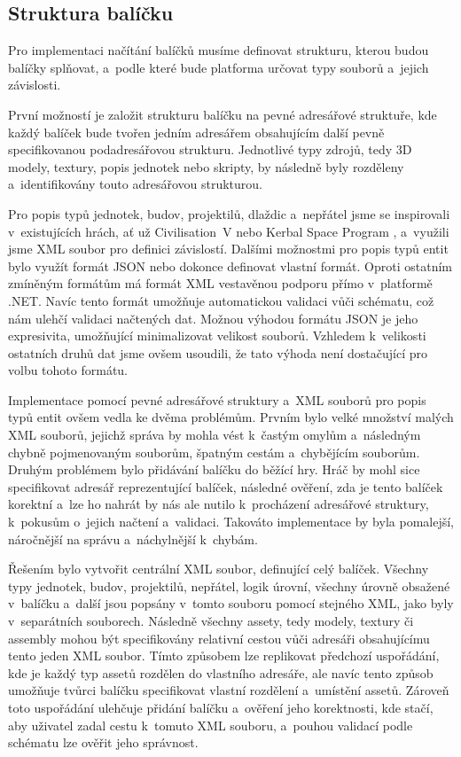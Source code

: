 \subsection{Struktura balíčku}
\label{sec:packagestructure}
Pro implementaci načítání balíčků musíme definovat strukturu, kterou budou balíčky splňovat, a~podle které bude platforma určovat typy souborů a~jejich závislosti.

První možností je založit strukturu balíčku na pevné adresářové struktuře, kde každý balíček bude tvořen jedním adresářem obsahujícím další pevně specifikovanou podadresářovou strukturu. Jednotlivé typy zdrojů, tedy 3D modely, textury, popis jednotek nebo skripty, by následně byly rozděleny a~identifikovány touto adresářovou strukturou. 

Pro popis typů jednotek, budov, projektilů, dlaždic a~nepřátel jsme se inspirovali v~existujících hrách, ať už Civilisation~V \citep{site:civ5} nebo Kerbal Space Program \citep{site:ksp}, a~využili jsme XML soubor pro definici závislostí. Dalšími možnostmi pro popis typů entit bylo využít formát JSON nebo dokonce definovat vlastní formát. Oproti ostatním zmíněným formátům má formát XML vestavěnou podporu přímo v~platformě .NET. Navíc tento formát umožňuje automatickou validaci vůči schématu, což nám ulehčí  validaci načtených dat. Možnou výhodou formátu JSON je jeho expresivita, umožňující minimalizovat velikost souborů. Vzhledem k~velikosti ostatních druhů dat jsme ovšem usoudili, že tato výhoda není dostačující pro volbu tohoto formátu. 

Implementace pomocí pevné adresářové struktury a~XML souborů pro popis typů entit ovšem vedla ke dvěma problémům. Prvním bylo velké množství malých XML souborů, jejichž správa by mohla vést k~častým omylům a~následným chybně pojmenovaným souborům, špatným cestám a~chybějícím souborům. Druhým problémem bylo přidávání balíčku do běžící hry. Hráč by mohl sice specifikovat adresář reprezentující balíček, následné ověření, zda je tento balíček korektní a~lze ho nahrát by nás ale nutilo k~procházení adresářové struktury, k~pokusům o~jejich načtení a~validaci. Takováto implementace by byla pomalejší, náročnější na správu a~náchylnější k~chybám. 

Řešením bylo vytvořit centrální XML soubor, definující celý balíček. Všechny typy jednotek, budov, projektilů, nepřátel, logik úrovní, všechny úrovně obsažené v~balíčku a~další jsou popsány v~tomto souboru pomocí stejného XML, jako byly v~separátních souborech. Následně všechny assety, tedy modely, textury či assembly mohou být specifikovány relativní cestou vůči adresáři obsahujícímu tento jeden XML soubor. Tímto způsobem lze replikovat předchozí uspořádání, kde je každý typ assetů rozdělen do vlastního adresáře, ale navíc tento způsob umožňuje tvůrci balíčku specifikovat vlastní rozdělení a~umístění assetů. Zároveň toto uspořádání ulehčuje přidání balíčku a~ověření jeho korektnosti, kde stačí, aby uživatel zadal cestu k~tomuto XML souboru, a~pouhou validací podle schématu lze ověřit jeho správnost.

